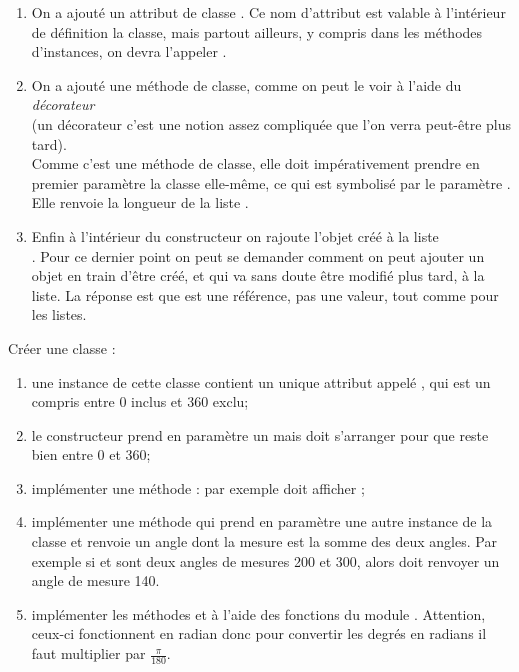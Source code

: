 \documentclass[a4paper,12pt,french]{book}
\begin{document}
    \begin{enumerate}[--]
        \item     On a ajouté un attribut de classe . Ce nom d'attribut est valable à l'intérieur de définition la classe, mais partout ailleurs, y compris dans les méthodes d'instances, on devra l'appeler .
        \item     On a ajouté une méthode de classe, comme on peut le voir à l'aide du \textit{décorateur}\\  (un décorateur c'est une notion assez compliquée que l'on verra peut-être plus tard).\\
        Comme c'est une méthode de classe, elle doit impérativement prendre en premier paramètre la classe elle-même, ce qui est symbolisé par le paramètre . Elle renvoie la longueur de la liste .
        \item    Enfin à l'intérieur du constructeur  on rajoute l'objet créé  à la liste\\ . Pour ce dernier point on peut se demander comment on peut ajouter un objet en train d'être créé, et qui va sans doute être modifié plus tard, à la liste. La réponse est que  est une référence, pas une valeur, tout comme pour les listes.
    \end{enumerate}
    \exostart
    
    \begin{exercice}[ : angles]
        Créer une classe :
        \begin{enumerate}[--]
            \item     une instance de cette classe contient un unique attribut appelé , qui est un  compris entre 0 inclus et 360 exclu;
            \item     le constructeur  prend en paramètre un  mais doit s'arranger pour que  reste bien entre 0 et 360;
            \item     implémenter une méthode  : par exemple  doit afficher ;
            \item    implémenter une méthode  qui prend en paramètre une autre instance de la classe  et renvoie un angle dont la mesure est la somme des deux angles. Par exemple si  et  sont deux angles de mesures 200 et 300, alors  doit renvoyer un angle de mesure 140.
            \item     implémenter les méthodes  et  à l'aide des fonctions du module . Attention, ceux-ci fonctionnent en radian donc pour convertir les degrés en radians il faut multiplier par $\frac{\pi}{180}$.
        \end{enumerate}    
    \end{exercice}
    
\end{document}
